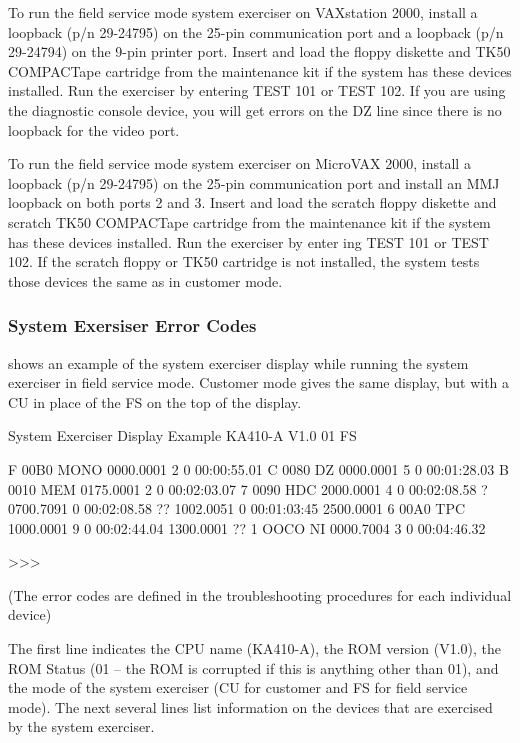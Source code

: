 To run the field service mode system exerciser on VAXstation 2000, install a
loopback (p/n 29-24795) on the 25-pin communication port and a loopback
(p/n 29-24794) on the 9-pin printer port. Insert and load the floppy diskette
and TK50 COMPACTape cartridge from the maintenance kit if the system
has these devices installed. Run the exerciser by entering TEST 101 or TEST
102. If you are using the diagnostic console device, you will get errors on
the DZ line since there is no loopback for the video port.

To run the field service mode system exerciser on MicroVAX 2000, install
a loopback (p/n 29-24795) on the 25-pin communication port and install an
MMJ loopback on both ports 2 and 3. Insert and load the scratch floppy
diskette and scratch TK50 COMPACTape cartridge from the maintenance
kit if the system has these devices installed. Run the exerciser by enter
ing TEST 101 or TEST 102. If the scratch floppy or TK50 cartridge is not
installed, the system tests those devices the same as in customer mode.

\subsubsection{System Exersiser Error Codes}

 shows an example of the system exerciser display while running
the system exerciser in field service mode. Customer mode gives the same
display, but with a CU in place of the FS on the top of the display.

\begin{ttfig}{System Exerciser Display Example}
KA410-A V1.0          01     FS

   F  00B0    MONO    0000.0001      2      0 00:00:55.01
   C  0080    DZ      0000.0001      5      0 00:01:28.03
   B  0010    MEM     0175.0001      2      0 00:02:03.07
   7  0090    HDC     2000.0001      4      0 00:02:08.58
?                     0700.7091             0 00:02:08.58
??                    1002.0051             0 00:01:03:45
                      2500.0001
   6  00A0    TPC     1000.0001      9      0 00:02:44.04
                      1300.0001
?? 1  OOCO    NI      0000.7004      3      0 00:04:46.32

>>>

  (The error codes are defined in the troubleshooting
   procedures for each individual device)
\end{ttfig}

The first line indicates the CPU name (KA410-A), the ROM version (V1.0),
the ROM Status (01 -- the ROM is corrupted if this is anything other than
01), and the mode of the system exerciser (CU for customer and FS for field
service mode). The next several lines list information on the devices that
are exercised by the system exerciser.

